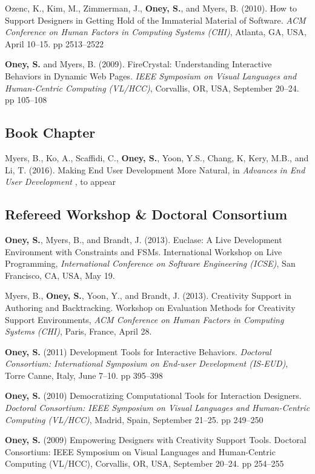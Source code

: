  {
Ozenc, K., Kim, M., Zimmerman, J., \textbf{Oney, S.}, and Myers, B. (2010). How to Support Designers in Getting Hold of the Immaterial Material of Software. \textit{ACM Conference on Human Factors in Computing Systems (CHI)}, Atlanta, GA, USA, April 10--15. pp 2513--2522
}

 {
\textbf{Oney, S.} and Myers, B. (2009). FireCrystal: Understanding Interactive Behaviors in Dynamic Web Pages. \textit{IEEE Symposium on Visual Languages and Human-Centric Computing (VL/HCC)}, Corvallis, OR, USA, September 20--24. pp 105--108
}

\subsection{Book Chapter}
 {
Myers, B., Ko, A., Scaffidi, C., \textbf{Oney, S.}, Yoon, Y.S., Chang, K, Kery, M.B., and Li, T. (2016). Making End User Development More Natural, in \textit{Advances in End User Development
}, to appear
}

\subsection{Refereed Workshop \& Doctoral Consortium}

 {
\textbf{Oney, S.}, Myers, B., and Brandt, J. (2013). Euclase: A Live Development Environment with Constraints and FSMs. International Workshop on Live Programming, \textit{International Conference on Software Engineering (ICSE)}, San Francisco, CA, USA, May 19.
}

 {
Myers, B., \textbf{Oney, S.}, Yoon, Y., and Brandt, J. (2013). Creativity Support in Authoring and Backtracking. Workshop on Evaluation Methods for Creativity Support Environments, \textit{ACM Conference on Human Factors in Computing Systems (CHI)}, Paris, France, April 28.
}

 {
\textbf{Oney, S.} (2011) Development Tools for Interactive Behaviors. \textit{Doctoral Consortium: International Symposium on End-user Development (IS-EUD)}, Torre Canne, Italy, June 7--10. pp 395--398
}

 {
\textbf{Oney, S.} (2010) Democratizing Computational Tools for Interaction Designers. \textit{Doctoral Consortium: IEEE Symposium on Visual Languages and Human-Centric Computing (VL/HCC)}, Madrid, Spain, September 21--25. pp 249--250
}

 {
\textbf{Oney, S.} (2009) Empowering Designers with Creativity Support Tools. Doctoral Consortium: IEEE Symposium on Visual Languages and Human-Centric Computing (VL/HCC), Corvallis, OR, USA, September 20--24. pp 254--255
}

